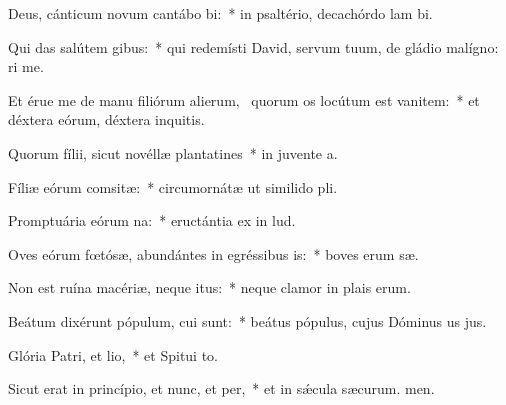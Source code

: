 \item Deus, cánticum novum cantábo bi:~* in psaltério, decachórdo lam bi.
\item Qui das salútem gibus:~* qui redemísti David, servum tuum, de gládio malígno: ri me.
\item Et érue me de manu filiórum alierum,~\pscross{} quorum os locútum est vanitem:~* et déxtera eórum, déxtera inquitis.
\item Quorum fílii, sicut novéllæ plantatines~* in juvente a.
\item Fíliæ eórum comsitæ:~* circumornátæ ut similido pli.
\item Promptuária eórum na:~* eructántia ex  in lud.
\item Oves eórum fœtósæ, abundántes in egréssibus is:~* boves erum sæ.
\item Non est ruína macériæ, neque itus:~* neque clamor in plais erum.
\item Beátum dixérunt pópulum, cui  sunt:~* beátus pópulus, cujus Dóminus us jus.
\item Glória Patri, et lio,~* et Spitui to.
\item Sicut erat in princípio, et nunc, et per,~* et in sǽcula sæcurum. men.
